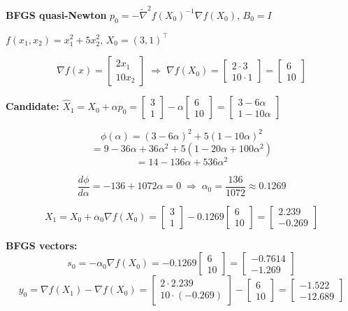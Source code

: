 \documentclass[10pt,a3paper]{article}
\begin{document}
\begin{minipage}[t]{0.26\linewidth}
\textbf{BFGS quasi-Newton} \quad $p_0 = -\tilde{\nabla}^2 f(X_0)^{-1}\nabla f(X_0)$,\; $B_0=I$

$f(x_1,x_2)=x_1^2+5x_2^2$,\; $X_0=(3,1)^\top$

\[
  \nabla f(x)=\begin{bmatrix}2x_1\\10x_2\end{bmatrix}
  \;\Rightarrow\;
  \nabla f(X_0)=\begin{bmatrix}2\cdot3\\10\cdot1\end{bmatrix}=\begin{bmatrix}6\\10\end{bmatrix}
\]

\textbf{Candidate:} $\hat{X}_1 = X_0+\alpha p_0 = \begin{bmatrix}3\\1\end{bmatrix}-\alpha\begin{bmatrix}6\\10\end{bmatrix} = \begin{bmatrix}3-6\alpha\\1-10\alpha\end{bmatrix}$

\[
  \phi(\alpha)=(3-6\alpha)^2+5(1-10\alpha)^2
\]
\[
  = 9-36\alpha+36\alpha^2+5(1-20\alpha+100\alpha^2)
\]
\[
  = 14-136\alpha+536\alpha^2
\]

\[
  \frac{d\phi}{d\alpha}=-136+1072\alpha=0
  \;\Rightarrow\; \alpha_0=\frac{136}{1072}\approx0.1269
\]

\[
  X_1 = X_0+\alpha_0\nabla f(X_0)
      = \begin{bmatrix}3\\1\end{bmatrix}-0.1269\begin{bmatrix}6\\10\end{bmatrix}
      = \begin{bmatrix}2.239\\-0.269\end{bmatrix}
\]

\textbf{BFGS vectors:}
\[
  s_0 = -\alpha_0\nabla f(X_0) = -0.1269\begin{bmatrix}6\\10\end{bmatrix}
      = \begin{bmatrix}-0.7614\\-1.269\end{bmatrix}
\]
\[
  y_0 = \nabla f(X_1)-\nabla f(X_0)
      = \begin{bmatrix}2\cdot2.239\\10\cdot(-0.269)\end{bmatrix}-\begin{bmatrix}6\\10\end{bmatrix}
      = \begin{bmatrix}-1.522\\-12.689\end{bmatrix}
\]

\end{minipage}%
\end{document}
